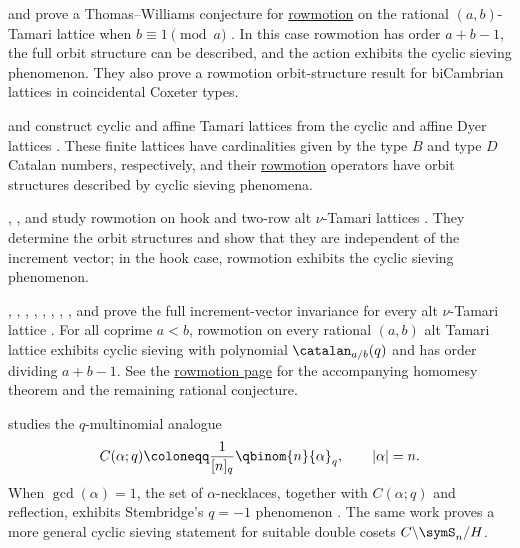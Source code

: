  and  prove a Thomas--Williams conjecture
for \hyperref[rowmotion]{rowmotion} on the rational $(a,b)$-Tamari lattice when
$b \equiv 1 \pmod a$ \cite{DefantLin2024}.  In this case rowmotion has order
$a+b-1$, the full orbit structure can be described, and the action exhibits
the cyclic sieving phenomenon.  They also prove a rowmotion orbit-structure
result for biCambrian lattices in coincidental Coxeter types.

 and  construct cyclic and affine
Tamari lattices from the cyclic and affine Dyer lattices
\cite{BarkleyDefant2025AffineTamari}.  These finite lattices have cardinalities
given by the type $B$ and type $D$ Catalan numbers, respectively, and their
\hyperref[rowmotion]{rowmotion} operators have orbit structures described by
cyclic sieving phenomena.

, , and  study
rowmotion on hook and two-row alt $\nu$-Tamari lattices
\cite{EuHioeLee2026x}.  They determine the orbit structures and show that they
are independent of the increment vector; in the hook case, rowmotion exhibits
the cyclic sieving phenomenon.

, , ,
, , ,
, , and 
prove the full increment-vector invariance for every alt $\nu$-Tamari lattice
\cite{AdenbaumBarnardCeballosCheneviereDefantHopkinsMullerRubeyStriker2026x}.
For all coprime $a\lt b$, rowmotion on every rational $(a,b)$ alt Tamari
lattice exhibits cyclic sieving with polynomial
$\catalan_{a/b}(q)$ and has order dividing $a+b-1$.  See the
\hyperref[rowmotionTamari]{rowmotion page} for the accompanying homomesy
theorem and the remaining rational conjecture.

 studies the $q$-multinomial analogue
\[
 C(\alpha;q) \coloneqq \frac{1}{[n]_q}\qbinom{n}{\alpha}_q,
 \qquad |\alpha|=n.
\]
When $\gcd(\alpha)=1$, the set of $\alpha$-necklaces, together with
$C(\alpha;q)$ and reflection, exhibits Stembridge's $q=-1$ phenomenon
\cite{Stucky2019x}.  The same work proves a more general cyclic sieving
statement for suitable double cosets $C\backslash \symS_n/H$.
